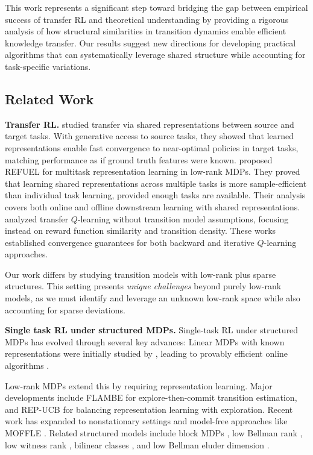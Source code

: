 This work represents a significant step toward bridging the gap between empirical success of transfer RL and theoretical understanding by providing a rigorous analysis of how structural similarities in transition dynamics enable efficient knowledge transfer. Our results suggest new directions for developing practical algorithms that can systematically leverage shared structure while accounting for task-specific variations.

\subsection{Related Work}

\noindent
\textbf{Transfer RL.}
\cite{agarwal2023provable} studied transfer via shared representations between source and target tasks. With generative access to source tasks, they showed that learned representations enable fast convergence to near-optimal policies in target tasks, matching performance as if ground truth features were known. \cite{cheng2022provable} proposed REFUEL for multitask representation learning in low-rank MDPs. They proved that learning shared representations across multiple tasks is more sample-efficient than individual task learning, provided enough tasks are available. Their analysis covers both online and offline downstream learning with shared representations.
\cite{chen2022transfer,chen2024data,chai2025deep} analyzed transfer $Q$-learning without transition model assumptions, focusing instead on reward function similarity and transition density. These works established convergence guarantees for both backward and iterative $Q$-learning approaches.

Our work differs by studying transition models with low-rank plus sparse structures. This setting presents {\em unique challenges} beyond purely low-rank models, as we must identify and leverage an unknown low-rank space while also accounting for sparse deviations.


\smallskip
\noindent
\textbf{Single task RL under structured MDPs.}
Single-task RL under structured MDPs has evolved through several key advances:
Linear MDPs with known representations were initially studied by \cite{yang2020reinforcement}, leading to provably efficient online algorithms \citep{sun2019model,jin2020provably,zanette2020learning,neu2020unifying,cai2020provably,wang2019optimism}.

Low-rank MDPs extend this by requiring representation learning. Major developments include FLAMBE \citep{agarwal2020flambe} for explore-then-commit transition estimation, and REP-UCB \citep{uehara2022representation} for balancing representation learning with exploration. Recent work has expanded to nonstationary settings \citep{cheng2023provably} and model-free approaches like MOFFLE \citep{modi2024model}.
Related structured models include block MDPs \citep{du2019provably,misra2020kinematic,zhang2022efficient}, low Bellman rank \citep{jiang2017contextual}, low witness rank \citep{sun2019model}, bilinear classes \citep{du2021bilinear}, and low Bellman eluder dimension \citep{jin2021bellman}.

